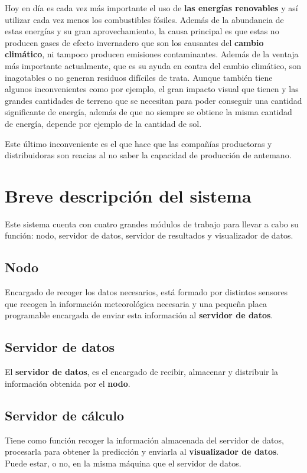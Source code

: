 Hoy en día es cada vez más importante el uso de \textbf{las energías renovables} y así utilizar cada vez menos los combustibles fósiles. Además de la abundancia de estas energías y su gran aprovechamiento, la causa principal es que estas no producen gases de efecto invernadero que son los causantes del \textbf{cambio climático}, ni tampoco producen emisiones contaminantes. Además de la ventaja más importante actualmente, que es su ayuda en contra del cambio climático, son inagotables o no generan residuos difíciles de trata. Aunque también tiene algunos inconvenientes como por ejemplo, el gran impacto visual que tienen y las grandes cantidades de terreno que se necesitan para poder conseguir una cantidad significante de energía, además de que no siempre se obtiene la misma cantidad de energía, depende por ejemplo de la cantidad de sol.

Este último inconveniente es el que hace que las compañías productoras y distribuidoras son reacias al no saber la capacidad de producción de antemano.




\section{Breve descripción del sistema}
\label{makereference1.2}

Este sistema cuenta con cuatro grandes módulos de trabajo para llevar a cabo su función: nodo, servidor de datos, servidor de resultados y visualizador de datos.

\subsection{Nodo}
\label{makereference1.2.1}
Encargado de recoger los datos necesarios, está formado por distintos sensores que recogen la información meteorológica necesaria y una pequeña placa programable encargada de enviar esta información al \textbf{servidor de datos}.

\subsection{Servidor de datos}
\label{makereference1.2.2}
El \textbf{servidor de datos}, es el encargado de recibir, almacenar y distribuir la información obtenida por el \textbf{nodo}.

\subsection{Servidor de cálculo}
\label{makereference1.2.3}
Tiene como función recoger la información almacenada del servidor de datos, procesarla para obtener la predicción y enviarla al \textbf{visualizador de datos}. Puede estar, o no, en la misma máquina que el servidor de datos.

